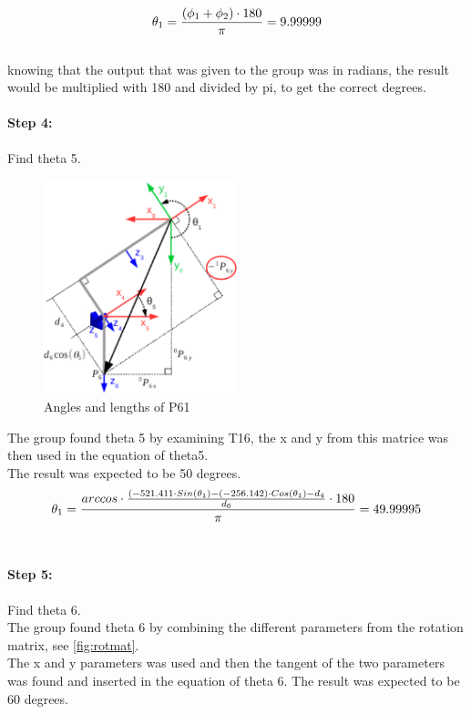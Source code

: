\begin{equation}
\centering
\theta_1 = \frac{(\phi_1+\phi_2)\cdot180}{\pi} = 9.99999
\end{equation}\\


knowing that the output that was given to the group was in radians, the result would be multiplied with 180 and divided by pi, to get the correct degrees.

\paragraph{Step 4:} Find theta 5.\\

\begin{figure}[H]
    \centering
    \includegraphics[width=0.5\textwidth]{Design/06.png}
    \caption{Angles and lengths of P61 \cite{Rasmus}} 
    \label{fig:rasmus2} 
\end{figure}

The group found theta 5 by examining T16, the x and y from this matrice was then used in the equation of theta5.\\
The result was expected to be 50 degrees.
\begin{equation}
\centering
\large\theta_1 =\frac{arccos\cdot\frac{(-521.411\cdot Sin(\theta_1)-(-256.142)\cdot Cos(\theta_1)-d_4}{d_6}\cdot 180}{\pi}=49.99995
\end{equation}\\


\paragraph{Step 5:} Find theta 6.\\

The group found theta 6 by combining the different parameters from the rotation matrix, see \ref{fig:rotmat}.\\
The x and y parameters was used and then the tangent of the two parameters was found and inserted in the equation of theta 6.
The result was expected to be 60 degrees.\\

